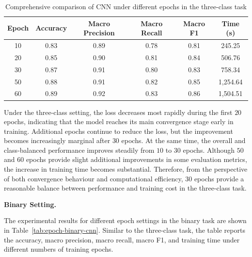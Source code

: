 \begin{table}[htbp]
    \centering
    \caption{Comprehensive comparison of CNN under different epochs in the three-class task}
    \label{tab:epoch-triclass-cnn}
    \begin{tabular}{cccccc}
        \toprule
        Epoch & Accuracy & Macro Precision &
        Macro Recall & Macro F1 & Time (s) \\
        \midrule
        10 & 0.83 & 0.89 & 0.78 & 0.81 & 245.25  \\
        20 & 0.85 & 0.90 & 0.81 & 0.84 & 506.76  \\
        30 & 0.87 & 0.91 & 0.80 & 0.83 & 758.34  \\
        50 & 0.88 & 0.91 & 0.82 & 0.85 & 1,254.64 \\
        60 & 0.89 & 0.92 & 0.83 & 0.86 & 1,504.51 \\
        \bottomrule
    \end{tabular}
\end{table}

\par Under the three-class setting, the loss decreases most rapidly during the
first $20$ epochs, indicating that the model reaches its main convergence stage
early in training. Additional epochs continue to reduce the loss, but the
improvement becomes increasingly marginal after $30$ epochs. At the same time,
the overall and class-balanced performance improves steadily from $10$ to
$30$ epochs. Although $50$ and $60$ epochs provide slight additional
improvements in some evaluation metrics, the increase in training time becomes
substantial. Therefore, from the perspective of both convergence behaviour and
computational efficiency, $30$ epochs provide a reasonable balance between
performance and training cost in the three-class task.

\par\medskip \noindent\textbf{Binary Setting.}
\par The experimental results for different epoch settings in the binary task
are shown in Table~\ref{tab:epoch-binary-cnn}. Similar to the three-class task,
the table reports the accuracy, macro precision, macro recall, macro F1, and
training time under different numbers of training epochs.

